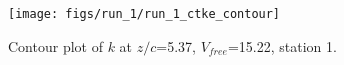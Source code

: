 \begin{figure}[H]
\centering
\texttt{[image: figs/run\_1/run\_1\_ctke\_contour]}
\caption{Contour plot of $k$ at $z/c$=5.37, $V_{free}$=15.22, station 1.}
\label{fig:run_1_ctke_contour}
\end{figure}



